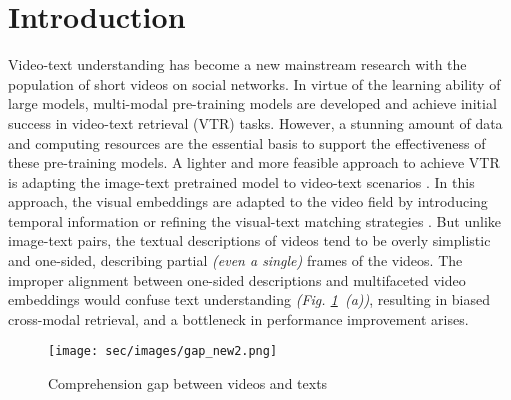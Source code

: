 \section{Introduction}
\label{sec:intro}
Video-text understanding has become a new mainstream research with the population of short videos on social networks. In virtue of the learning ability of large models, multi-modal pre-training models \cite{li2023unmasked,chen2024vast} are developed and achieve initial success in video-text retrieval (VTR) tasks. However, a stunning amount of data and computing resources are the essential basis to support the effectiveness of these pre-training models.
A lighter and more feasible approach to achieve VTR is adapting the image-text pretrained model to video-text scenarios \cite{luo2022clip4clip,xue2022clip}. In this approach, 
the visual embeddings are adapted to the video field by introducing temporal information \cite{sun2022long-form,Chen2022LiteVLEV} or refining the visual-text matching strategies \cite{gao2021clip2tv,xue2022clip}. 
But unlike image-text pairs, the textual descriptions of videos tend to be overly simplistic and one-sided, describing partial \textit{(even a single)} frames of the videos. 
The improper alignment between one-sided descriptions and multifaceted video embeddings would confuse text understanding \textit{(Fig. \ref{fig:gap}~(a))}, resulting in biased cross-modal retrieval, and a bottleneck in performance improvement arises.




\begin{figure}[t]
\centering
\texttt{[image: sec/images/gap\_new2.png]} 
\caption{Comprehension gap between videos and texts}
\label{fig:gap}
\end{figure}

